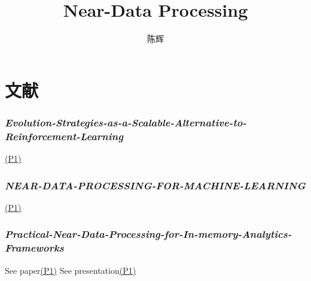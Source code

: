 \documentclass{article}
\title{Near-Data Processing}
\author{陈辉}
\date{}
\newcommand{\paper}[2]{\hyperlink{./papers/#1.pdf.#2}{(P#2)}}
\begin{document}
\maketitle
\tableofcontents
\newpage
\part{文献}
\section{\textit{Evolution-Strategies-as-a-Scalable-Alternative-to-Reinforcement-Learning}}
\paper{Evolution-Strategies-as-a-Scalable-Alternative-to-Reinforcement-Learning}{1}
\section{\textit{NEAR-DATA-PROCESSING-FOR-MACHINE-LEARNING}}
\paper{NEAR-DATA-PROCESSING-FOR-MACHINE-LEARNING}{1}
\section{\textit{Practical-Near-Data-Processing-for-In-memory-Analytics-Frameworks}}
See paper\paper{Practical-Near-Data-Processing-for-In-memory-Analytics-Frameworks}{1}
See presentation\paper{Practical-Near-Data-Processing-for-In-memory-Analytics-Frameworks(Presentation)}{1}











%
%
\end{document}

